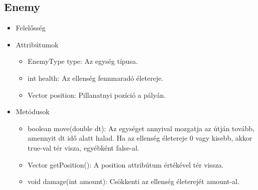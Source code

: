 \subsection{Enemy}
\begin{itemize}
\item Felelősség\\

\item Attribútumok\\
	\begin{itemize}
		\item EnemyType type: Az egység típusa.
		\item int health: Az ellenség fennmaradó életereje.
		\item Vector position: Pillanatnyi pozíció a pályán.
	\end{itemize}
\item Metódusok\\
	\begin{itemize}
		\item boolean move(double dt): Az egységet annyival mozgatja az útján tovább, amennyit dt idő alatt halad. Ha az ellenség életereje 0 vagy kisebb, akkor true-val tér visza, egyébként false-al.
		\item Vector getPosition(): A position attribútum értékével tér vissza.
		\item void damage(int amount): Csökkenti az ellenség életerejét amount-al.
	\end{itemize}
\end{itemize}

